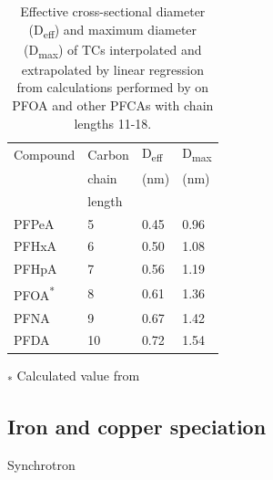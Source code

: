 \begin{table}
\caption{Effective cross-sectional diameter (D\textsubscript{eff}) and maximum diameter (D\textsubscript{max}) of TCs interpolated and extrapolated by linear regression from calculations performed by \citep{inoue2012size} on PFOA and other PFCAs with chain lengths 11-18.}
\centering
\begin{threeparttable}
\label{tab:molecsize}
\begin{tabular}{llll}
\toprule
Compound & Carbon & D\textsubscript{eff} & D\textsubscript{max} \\ 
& chain & (nm) & (nm) \\
& length & & \\ \midrule
PFPeA    & 5                                                              & 0.45                                                 & 0.96                                                 \\
PFHxA    & 6                                                              & 0.50                                                 & 1.08                                                 \\
PFHpA    & 7                                                              & 0.56                                                 & 1.19                                                 \\
PFOA\textsuperscript{*}     & 8                                                              & 0.61                                                 & 1.36                                                 \\
PFNA     & 9                                                              & 0.67                                                 & 1.42                                                 \\
PFDA     & 10                                                             & 0.72                                                 & 1.54  \\ \bottomrule                                    
\end{tabular}
\begin{tablenotes}
\item \textsubscript{*} Calculated value from \citep{inoue2012size}
\end{tablenotes}
\end{threeparttable}
\end{table}

\subsection{Iron and copper speciation}
Synchrotron

